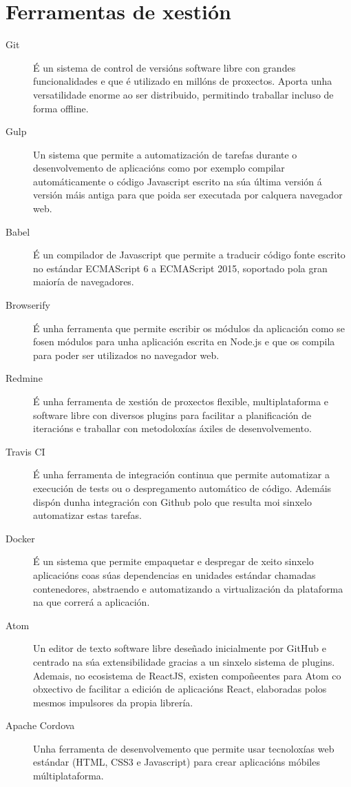  \section{Ferramentas de xestión}

  \begin{description}
   \item [Git]\cite{web:git} É un sistema de control de 
versións software libre con grandes funcionalidades e que é utilizado en 
millóns de proxectos. Aporta unha versatilidade enorme ao ser distribuido, 
permitindo traballar incluso de forma offline.
   \item [Gulp]\cite{web:gulp} Un sistema que permite a 
automatización de tarefas durante o desenvolvemento de aplicacións como por 
exemplo compilar automáticamente o código Javascript escrito na súa última 
versión á versión máis antiga para que poida ser executada por calquera 
navegador web.
    \item [Babel]\cite{web:babel} É un compilador de 
Javascript que permite a traducir código fonte escrito no estándar ECMAScript 6 
a ECMAScript 2015, soportado pola gran maioría de navegadores.
    \item [Browserify]\cite{web:browserify} É unha ferramenta 
que permite escribir os módulos da aplicación como se fosen módulos para unha 
aplicación escrita en Node.js e que os compila para poder ser utilizados no 
navegador web.
   \item [Redmine]\cite{web:redmine} É unha ferramenta de 
xestión de proxectos flexible, multiplataforma e software libre con diversos 
plugins para facilitar a planificación de iteracións e traballar con 
metodoloxías áxiles de desenvolvemento.
   \item [Travis CI]\cite{web:travis} É unha ferramenta de 
integración continua que permite automatizar a execución de tests ou o 
despregamento automático de código. Ademáis dispón dunha integración con Github 
polo que resulta moi sinxelo automatizar estas tarefas.
   \item [Docker]\cite{web:docker} É un sistema que permite 
empaquetar e despregar de xeito sinxelo aplicacións coas súas dependencias en 
unidades estándar chamadas contenedores, abstraendo e automatizando a 
virtualización da plataforma na que correrá a aplicación.
   \item [Atom]\cite{web:atom} Un editor de texto software libre 
deseñado inicialmente por GitHub e centrado na súa extensibilidade gracias a un 
sinxelo sistema de plugins. Ademais, no ecosistema de ReactJS, existen 
compoñeentes para Atom co obxectivo de facilitar a edición de aplicacións React, 
elaboradas polos mesmos impulsores da propia librería.
   \item [Apache Cordova]\cite{web:apachecordova} Unha 
ferramenta de desenvolvemento que permite usar tecnoloxías web estándar (HTML, 
CSS3 e Javascript) para crear aplicacións móbiles múltiplataforma.

  \end{description}

